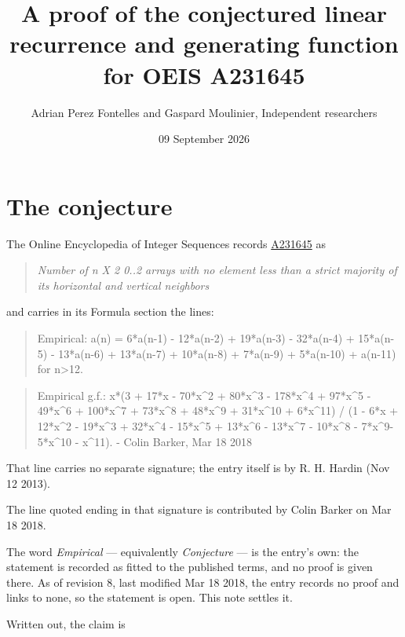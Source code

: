 \documentclass[11pt]{article}
\title{A proof of the conjectured linear recurrence and generating function for OEIS A231645}
\author{Adrian Perez Fontelles and Gaspard Moulinier, Independent researchers}
\date{09 September 2026}
\theoremstyle{definition}
\begin{document}
\maketitle
\section{The conjecture}

The Online Encyclopedia of Integer Sequences records \href{https://oeis.org/A231645}{A231645} as

\begin{quote}\itshape Number of n X 2 0..2 arrays with no element less than a strict majority of its horizontal and vertical neighbors\end{quote}

and carries in its Formula section the lines:

\begin{quote}\ttfamily Empirical: a(n) = 6*a(n-1) - 12*a(n-2) + 19*a(n-3) - 32*a(n-4) + 15*a(n-5) - 13*a(n-6) + 13*a(n-7) + 10*a(n-8) + 7*a(n-9) + 5*a(n-10) + a(n-11) for n>12.\end{quote}

\begin{quote}\ttfamily Empirical g.f.: x*(3 + 17*x - 70*x\textasciicircum{}2 + 80*x\textasciicircum{}3 - 178*x\textasciicircum{}4 + 97*x\textasciicircum{}5 - 49*x\textasciicircum{}6 + 100*x\textasciicircum{}7 + 73*x\textasciicircum{}8 + 48*x\textasciicircum{}9 + 31*x\textasciicircum{}10 + 6*x\textasciicircum{}11) / (1 - 6*x + 12*x\textasciicircum{}2 - 19*x\textasciicircum{}3 + 32*x\textasciicircum{}4 - 15*x\textasciicircum{}5 + 13*x\textasciicircum{}6 - 13*x\textasciicircum{}7 - 10*x\textasciicircum{}8 - 7*x\textasciicircum{}9- 5*x\textasciicircum{}10 - x\textasciicircum{}11). - Colin Barker, Mar 18 2018\end{quote}

That line carries no separate signature; the entry itself is by R. H. Hardin (Nov 12 2013).

The line quoted ending in that signature is contributed by Colin Barker on Mar 18 2018.

The word {\itshape Empirical} --- equivalently {\itshape Conjecture} --- is the entry's own: the statement is recorded as fitted to the published terms, and no proof is given there. As of revision 8, last modified Mar 18 2018, the entry records no proof and links to none, so the statement is open. This note settles it.

Written out, the claim is
\end{document}
